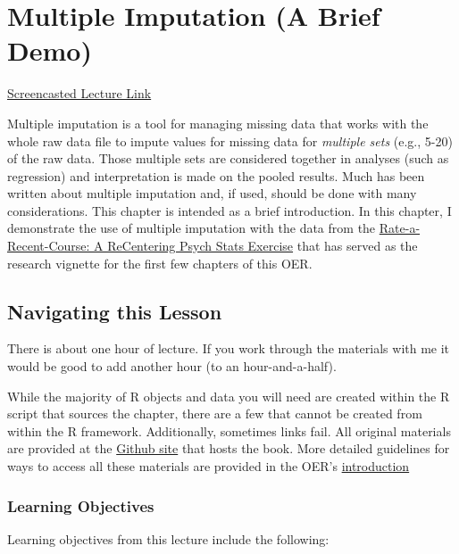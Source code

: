 \documentclass[
]{book}
\begin{document}
\hypertarget{multimp}{%
\chapter{Multiple Imputation (A Brief Demo)}\label{multimp}}

\href{https://spu.hosted.panopto.com/Panopto/Pages/Viewer.aspx?pid=94d59efe-3f02-4c65-b068-ad01003e09a9}{Screencasted Lecture Link}

Multiple imputation is a tool for managing missing data that works with the whole raw data file to impute values for missing data for \emph{multiple sets} (e.g., 5-20) of the raw data. Those multiple sets are considered together in analyses (such as regression) and interpretation is made on the pooled results. Much has been written about multiple imputation and, if used, should be done with many considerations. This chapter is intended as a brief introduction. In this chapter, I demonstrate the use of multiple imputation with the data from the \href{https://spupsych.az1.qualtrics.com/jfe/form/SV_b2cClqAlLGQ6nLU}{Rate-a-Recent-Course: A ReCentering Psych Stats Exercise} that has served as the research vignette for the first few chapters of this OER.

\hypertarget{navigating-this-lesson-3}{%
\section{Navigating this Lesson}\label{navigating-this-lesson-3}}

There is about one hour of lecture. If you work through the materials with me it would be good to add another hour (to an hour-and-a-half).

While the majority of R objects and data you will need are created within the R script that sources the chapter, there are a few that cannot be created from within the R framework. Additionally, sometimes links fail. All original materials are provided at the \href{https://github.com/lhbikos/ReC_MultivModel}{Github site} that hosts the book. More detailed guidelines for ways to access all these materials are provided in the OER's \protect\hyperlink{ReCintro}{introduction}

\hypertarget{learning-objectives-3}{%
\subsection{Learning Objectives}\label{learning-objectives-3}}

Learning objectives from this lecture include the following:
\end{document}
